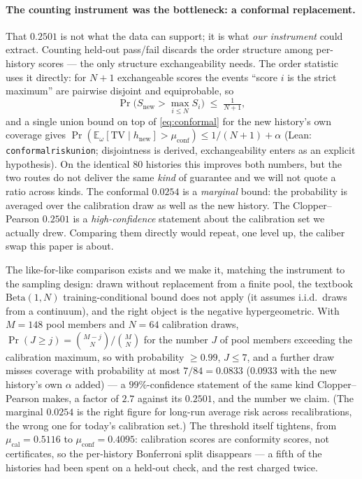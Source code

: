 \documentclass[11pt]{article}
\renewcommand{\_}{\WCorigunderscore\allowbreak}
\begin{document}
\paragraph{The counting instrument was the bottleneck: a conformal replacement.}
That $0.2501$ is not what the data can support; it is what \emph{our
instrument} could extract. Counting held-out pass/fail discards the
order structure among per-history scores --- the only structure
exchangeability needs. The order statistic uses it directly: for $N+1$
exchangeable scores the events ``score $i$ is the strict maximum'' are
pairwise disjoint and equiprobable, so
\begin{equation}\label{eq:conformal}
\Pr\bigl(S_{\text{new}}>\max_{i\le N}S_i\bigr)\;\le\;\tfrac{1}{N+1},
\end{equation}
and a single union bound on top of \eqref{eq:conformal} for the new
history's own coverage gives
$\Pr(\mathbb{E}_\omega[\mathrm{TV}\mid h_{\text{new}}]>\mu_{\mathrm{conf}})
\le 1/(N+1)+\alpha$ (Lean: \texttt{conformal\_risk\_union}; disjointness
is derived, exchangeability enters as an explicit hypothesis).
On the identical $80$ histories this improves both numbers, but the two
routes do not deliver the same \emph{kind} of guarantee and we will not
quote a ratio across kinds. The conformal $0.0254$ is a \emph{marginal}
bound: the probability is averaged over the calibration draw as well as
the new history. The Clopper--Pearson $0.2501$ is a \emph{high-confidence}
statement about the calibration set we actually drew. Comparing them
directly would repeat, one level up, the caliber swap this paper is
about.

The like-for-like comparison exists and we make it, matching the
instrument to the sampling design: drawn without replacement from a
finite pool, the textbook $\mathrm{Beta}(1,N)$ training-conditional
bound does not apply (it assumes i.i.d.\ draws from a continuum), and
the right object is the negative hypergeometric. With $M=148$ pool
members and $N=64$ calibration draws,
$\Pr(J\ge j)=\binom{M-j}{N}/\binom{M}{N}$ for the number $J$ of pool
members exceeding the calibration maximum, so with probability
$\ge0.99$, $J\le7$, and a further draw misses coverage with probability
at most $7/84=0.0833$ ($0.0933$ with the new history's own $\alpha$
added) --- a $99\%$-confidence statement of the same kind
Clopper--Pearson makes, a factor of $2.7$ against its $0.2501$, and the
number we claim. (The marginal $0.0254$ is the right figure for
long-run average risk across recalibrations, the wrong one for today's
calibration set.) The threshold itself tightens, from
$\mu_{\mathrm{cal}}=0.5116$ to $\mu_{\mathrm{conf}}=0.4095$:
calibration scores are conformity scores, not certificates, so the
per-history Bonferroni split disappears --- a fifth of the histories
had been spent on a held-out check, and the rest charged twice.
\end{document}
